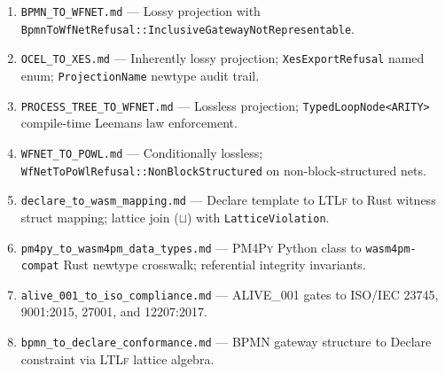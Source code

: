 \begin{enumerate}
  \item \texttt{BPMN\_TO\_WFNET.md} --- Lossy projection with \texttt{BpmnToWfNetRefusal::InclusiveGatewayNotRepresentable}.
  \item \texttt{OCEL\_TO\_XES.md} --- Inherently lossy projection; \texttt{XesExportRefusal} named enum; \texttt{ProjectionName} newtype audit trail.
  \item \texttt{PROCESS\_TREE\_TO\_WFNET.md} --- Lossless projection; \texttt{TypedLoopNode<ARITY>} compile-time Leemans law enforcement.
  \item \texttt{WFNET\_TO\_POWL.md} --- Conditionally lossless; \texttt{WfNetToPoWlRefusal::NonBlockStructured} on non-block-structured nets.
  \item \texttt{declare\_to\_wasm\_mapping.md} --- Declare template to \textsc{LTLf} to Rust witness struct mapping; lattice join (\(\sqcup\)) with \texttt{LatticeViolation}.
  \item \texttt{pm4py\_to\_wasm4pm\_data\_types.md} --- \textsc{PM4Py} Python class to \texttt{wasm4pm-compat} Rust newtype crosswalk; referential integrity invariants.
  \item \texttt{alive\_001\_to\_iso\_compliance.md} --- \textsc{ALIVE\_001} gates to \textsc{ISO/IEC} 23745, 9001:2015, 27001, and 12207:2017.
  \item \texttt{bpmn\_to\_declare\_conformance.md} --- \textsc{BPMN} gateway structure to Declare constraint via \textsc{LTLf} lattice algebra.
\end{enumerate}
